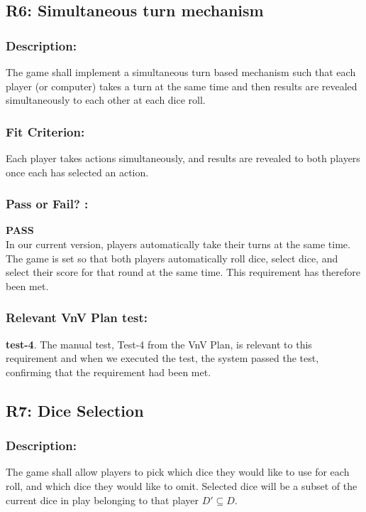 \documentclass[12pt, titlepage]{article}
\begin{document}
\subsection{R6: Simultaneous turn mechanism} 
\label{R6} 

\subsubsection*{Description:}The game shall implement a simultaneous turn based mechanism such that each player (or computer) takes a turn at the same time and then results are revealed simultaneously to each other at each dice roll.

\subsubsection*{Fit Criterion:} Each player takes actions simultaneously, and results are revealed to both players once each has selected an action.

\subsubsection*{Pass or Fail? :} 

 \noindent \textbf{PASS}\\
 
  In our current version, players automatically take their turns at the same time. The game is set so that both players automatically roll dice, select dice, and select their score for that round at the same time. This requirement has therefore been met.

\subsubsection*{Relevant VnV Plan test: } \textbf{test-4}.  The manual test, Test-4 from the VnV Plan, is relevant to this requirement and when we executed the test, the system passed the test, confirming that the requirement had been met.


\subsection{R7: Dice Selection} 
\label{R7} 

\subsubsection*{Description:} The game shall allow players to pick which dice they would like to use for each roll, and which dice they would like to omit. Selected dice will be a subset of the current dice in play belonging to that player $D' \subseteq D$.
\end{document}
